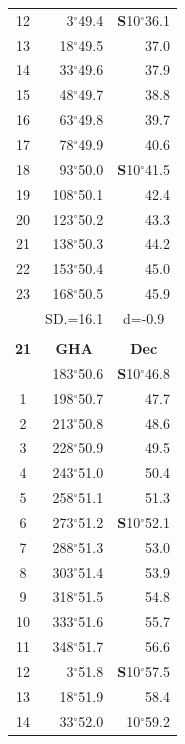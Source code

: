 \documentclass[10pt, a4paper]{report}
\begin{document}
\begin{scriptsize}
\begin{tabular*}{0.2\textwidth}[t]{@{\extracolsep{\fill}}|c|rr|}
12 & 3$^\circ$49.4 & \textbf{S}10$^\circ$36.1\\
13 & 18$^\circ$49.5 & 37.0\\
14 & 33$^\circ$49.6 & 37.9\\
15 & 48$^\circ$49.7 & \raisebox{0.24ex}{\boldmath$\cdot$~\boldmath$\cdot$~~}38.8\\
16 & 63$^\circ$49.8 & 39.7\\
17 & 78$^\circ$49.9 & 40.6\\[2Pt]
18 & 93$^\circ$50.0 & \textbf{S}10$^\circ$41.5\\
19 & 108$^\circ$50.1 & 42.4\\
20 & 123$^\circ$50.2 & 43.3\\
21 & 138$^\circ$50.3 & \raisebox{0.24ex}{\boldmath$\cdot$~\boldmath$\cdot$~~}44.2\\
22 & 153$^\circ$50.4 & 45.0\\
23 & 168$^\circ$50.5 & 45.9\\
\hline
\rule{0pt}{2.4ex} & \multicolumn{1}{c}{SD.=16.1} & \multicolumn{1}{c|}{d=-0.9}\\
\hline
\multicolumn{1}{c}{}\\[-0.5ex]\hline
\multicolumn{1}{|c|}{\rule{0pt}{2.6ex}\textbf{21}} & \multicolumn{1}{c}{\textbf{GHA}} & \multicolumn{1}{c|}{\textbf{Dec}}\\
\hline\rule{0pt}{2.6ex}\noindent
0 & 183$^\circ$50.6 & \textbf{S}10$^\circ$46.8\\
1 & 198$^\circ$50.7 & 47.7\\
2 & 213$^\circ$50.8 & 48.6\\
3 & 228$^\circ$50.9 & \raisebox{0.24ex}{\boldmath$\cdot$~\boldmath$\cdot$~~}49.5\\
4 & 243$^\circ$51.0 & 50.4\\
5 & 258$^\circ$51.1 & 51.3\\[2Pt]
6 & 273$^\circ$51.2 & \textbf{S}10$^\circ$52.1\\
7 & 288$^\circ$51.3 & 53.0\\
8 & 303$^\circ$51.4 & 53.9\\
9 & 318$^\circ$51.5 & \raisebox{0.24ex}{\boldmath$\cdot$~\boldmath$\cdot$~~}54.8\\
10 & 333$^\circ$51.6 & 55.7\\
11 & 348$^\circ$51.7 & 56.6\\[2Pt]
12 & 3$^\circ$51.8 & \textbf{S}10$^\circ$57.5\\
13 & 18$^\circ$51.9 & 58.4\\
14 & 33$^\circ$52.0 & 10$^\circ$59.2\\

\end{tabular*}
\end{scriptsize}
\end{document}
